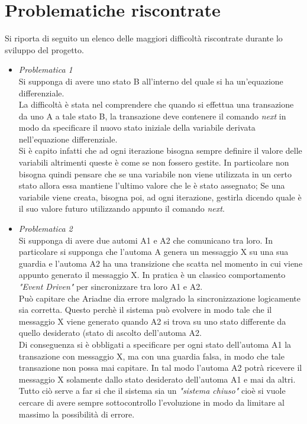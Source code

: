 \documentclass[12pt]{article}
\begin{document}
\newpage
\section{Problematiche riscontrate}
Si riporta di seguito un elenco delle maggiori difficoltà riscontrate durante lo sviluppo del progetto.
\begin{itemize}
	\item \textit{Problematica 1}\\
	Si supponga di avere uno stato B all'interno del quale si ha un'equazione differenziale. \\
	La difficoltà è stata nel comprendere che quando si effettua una transazione da uno A a tale stato B, la transazione deve contenere il comando \textit{next} in modo da specificare il nuovo stato iniziale della variabile derivata nell'equazione differenziale. \\
	Si è capito infatti che ad ogni iterazione bisogna sempre definire il valore delle variabili altrimenti queste è come se non fossero gestite. In particolare non bisogna quindi pensare che se una variabile non viene utilizzata in un certo stato allora essa mantiene l'ultimo valore che le è stato assegnato; Se una variabile viene creata, bisogna poi, ad ogni iterazione, gestirla dicendo quale è il suo valore futuro utilizzando appunto il comando \textit{next}.
	
	\item \textit{Problematica 2}\\
	Si supponga di avere due automi A1 e A2 che comunicano tra loro. In particolare si supponga che l'automa A genera un messaggio X su una sua guardia e l'automa A2 ha una transizione che scatta nel momento in cui viene appunto generato il messaggio X. In pratica è un classico comportamento \textit{"Event Driven"} per sincronizzare tra loro A1 e A2.\\
	Può capitare che Ariadne dia errore malgrado la sincronizzazione logicamente sia corretta. Questo perchè il sistema può evolvere in modo tale che il messaggio X viene generato quando A2 si trova su uno stato differente da quello desiderato (stato di ascolto dell'automa A2.\\
	Di conseguenza si è obbligati a specificare per ogni stato dell'automa A1 la transazione con messaggio X, ma con una guardia falsa, in modo che tale transazione non possa mai capitare. In tal modo l'automa A2 potrà ricevere il messaggio X solamente dallo stato desiderato dell'automa A1 e mai da altri.\\
	Tutto ciò serve a far si che il sistema sia un \textit{"sistema chiuso"} cioè si vuole cercare di avere sempre sottocontrollo l'evoluzione in modo da limitare al massimo la possibilità di errore.
	

\end{itemize}
\end{document}
